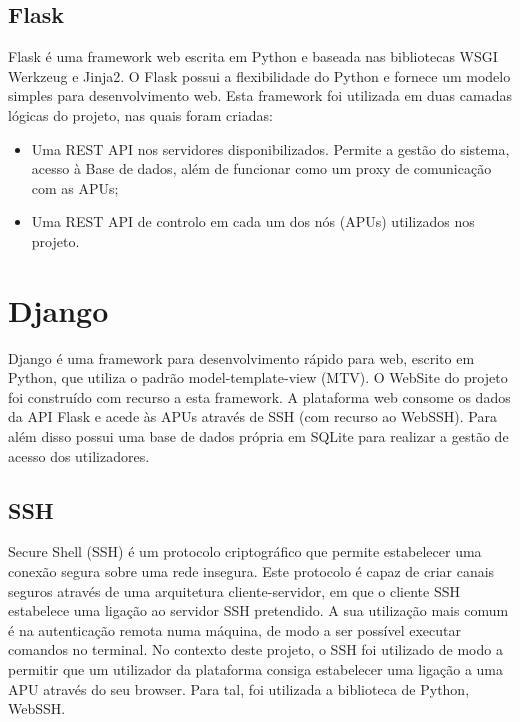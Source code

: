 \subsection{Flask}
Flask é uma framework web escrita em Python e baseada nas bibliotecas WSGI Werkzeug e  Jinja2. O Flask possui a flexibilidade do Python e fornece um modelo simples para desenvolvimento web.\newline
Esta framework foi utilizada em duas camadas lógicas do projeto, nas quais foram criadas:
\begin{itemize}
    \item Uma REST API nos servidores disponibilizados. Permite a gestão do sistema, acesso à Base de dados, além de funcionar como um proxy de comunicação com as APUs;
    \item Uma REST API de controlo em cada um dos nós (APUs) utilizados nos projeto.
\end{itemize}

\section{Django}
Django é uma framework para desenvolvimento rápido para web, escrito em Python, que utiliza o padrão model-template-view (MTV). \newline
O WebSite do projeto foi construído com recurso a esta framework. A plataforma web  consome os dados da API Flask e acede às APUs através de SSH (com recurso ao WebSSH). Para além disso possui uma  base de dados própria em SQLite para realizar a gestão de acesso dos utilizadores.

\subsection{SSH}
Secure Shell (SSH) é um protocolo criptográfico que permite estabelecer uma conexão segura sobre uma rede insegura. Este protocolo é capaz de criar canais seguros através de uma arquitetura cliente-servidor, em que o cliente SSH estabelece uma ligação ao servidor SSH pretendido. A sua utilização mais comum é na autenticação remota numa máquina, de modo a ser possível executar comandos no terminal.\newline
No contexto deste projeto, o SSH foi utilizado de modo a permitir que um utilizador da plataforma consiga estabelecer uma ligação a uma APU através do seu browser. Para tal, foi utilizada a biblioteca de Python, WebSSH. 

